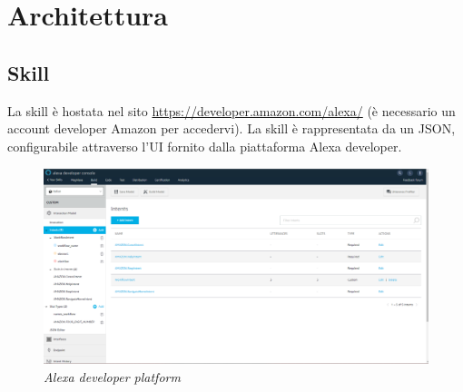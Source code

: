 \chapter{Architettura}
\section{Skill}\label{architetturaSkill}
La skill è hostata nel sito \url{https://developer.amazon.com/alexa/} (è necessario un account developer Amazon per accedervi). La skill è rappresentata da un JSON, configurabile attraverso l'UI fornito dalla piattaforma Alexa developer.
\begin{figure} [H]
    \centering
	\includegraphics[scale=0.2]{./images/SkillPage.PNG}
	\caption{\textit{Alexa developer platform}}\label{classlambda}
\end{figure}


